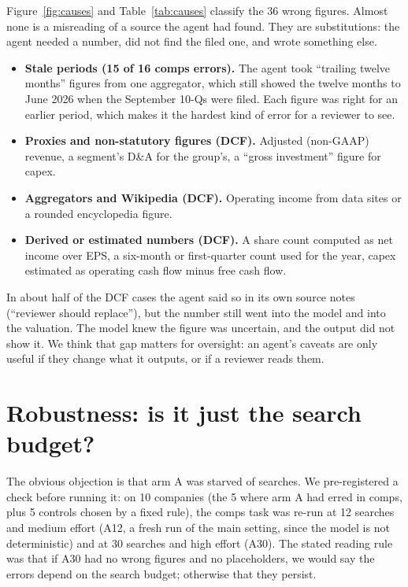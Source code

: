 \documentclass[10pt,a4paper]{article}
\begin{document}
Figure~\ref{fig:causes} and Table~\ref{tab:causes} classify the 36 wrong figures. Almost none is a misreading of a
source the agent had found. They are substitutions: the agent needed a number, did not find the filed one, and wrote
something else.
\begin{itemize}
  \item \textbf{Stale periods (15 of 16 comps errors).} The agent took ``trailing twelve months'' figures from one
        aggregator, which still showed the twelve months to June 2026 when the September 10-Qs were filed. Each figure
        was right for an earlier period, which makes it the hardest kind of error for a reviewer to see.
  \item \textbf{Proxies and non-statutory figures (DCF).} Adjusted (non-GAAP) revenue, a segment's D\&A for the
        group's, a ``gross investment'' figure for capex.
  \item \textbf{Aggregators and Wikipedia (DCF).} Operating income from data sites or a rounded encyclopedia figure.
  \item \textbf{Derived or estimated numbers (DCF).} A share count computed as net income over EPS, a six-month or
        first-quarter count used for the year, capex estimated as operating cash flow minus free cash flow.
\end{itemize}
In about half of the DCF cases the agent said so in its own source notes (``reviewer should replace''), but the
number still went into the model and into the valuation. The model knew the figure was uncertain, and the output
did not show it. We think that gap matters for oversight: an agent's caveats are only useful if they change what it
outputs, or if a reviewer reads them.

\section{Robustness: is it just the search budget?}

The obvious objection is that arm A was starved of searches. We pre-registered a check before running it: on 10
companies (the 5 where arm A had erred in comps, plus 5 controls chosen by a fixed rule), the comps task was re-run at
12 searches and medium effort (A12, a fresh run of the main setting, since the model is not deterministic) and at 30
searches and high effort (A30). The stated reading rule was that if A30 had no wrong figures and no placeholders, we
would say the errors depend on the search budget; otherwise that they persist.
\end{document}
